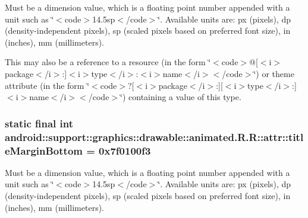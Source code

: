 Must be a dimension value, which is a floating point number appended with a unit such as \char`\"{}$<$code$>$14.5sp$<$/code$>$\char`\"{}. Available units are: px (pixels), dp (density-independent pixels), sp (scaled pixels based on preferred font size), in (inches), mm (millimeters). 

This may also be a reference to a resource (in the form \char`\"{}$<$code$>$@\mbox{[}$<$i$>$package$<$/i$>$:\mbox{]}$<$i$>$type$<$/i$>$:$<$i$>$name$<$/i$>$$<$/code$>$\char`\"{}) or theme attribute (in the form \char`\"{}$<$code$>$?\mbox{[}$<$i$>$package$<$/i$>$:\mbox{]}\mbox{[}$<$i$>$type$<$/i$>$:\mbox{]}$<$i$>$name$<$/i$>$$<$/code$>$\char`\"{}) containing a value of this type. \hypertarget{classandroid_1_1support_1_1graphics_1_1drawable_1_1animated_1_1_r_1_1attr_0ffd907edd19e1d32591dee31fb08ac6}{
\subsubsection[{titleMarginBottom}]{\setlength{\rightskip}{0pt plus 5cm}static final int android::support::graphics::drawable::animated.R.R::attr::titleMarginBottom = 0x7f0100f3}}
\label{classandroid_1_1support_1_1graphics_1_1drawable_1_1animated_1_1_r_1_1attr_0ffd907edd19e1d32591dee31fb08ac6}


Must be a dimension value, which is a floating point number appended with a unit such as \char`\"{}$<$code$>$14.5sp$<$/code$>$\char`\"{}. Available units are: px (pixels), dp (density-independent pixels), sp (scaled pixels based on preferred font size), in (inches), mm (millimeters). 

